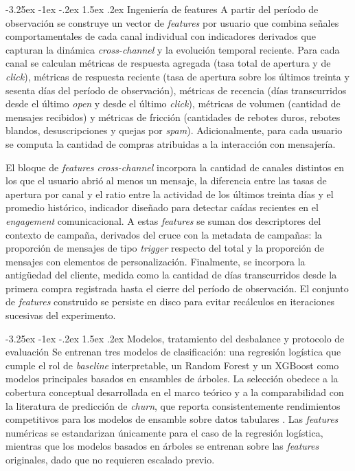 \documentclass[11pt,a4paper]{article}
\makeatletter
\renewcommand\subsection{\@startsection{subsection}{2}{\z@}%
  {-3.25ex \@plus -1ex \@minus -.2ex}%
  {1.5ex \@plus .2ex}%
  {\normalfont\normalsize\itshape}}
\makeatother
\begin{document}
\subsection{Ingeniería de features}
A partir del período de observación se construye un vector de \textit{features} por usuario que combina señales comportamentales de cada canal individual con indicadores derivados que capturan la dinámica \textit{cross-channel} y la evolución temporal reciente. Para cada canal se calculan métricas de respuesta agregada (tasa total de apertura y de \textit{click}), métricas de respuesta reciente (tasa de apertura sobre los últimos treinta y sesenta días del período de observación), métricas de recencia (días transcurridos desde el último \textit{open} y desde el último \textit{click}), métricas de volumen (cantidad de mensajes recibidos) y métricas de fricción (cantidades de rebotes duros, rebotes blandos, desuscripciones y quejas por \textit{spam}). Adicionalmente, para cada usuario se computa la cantidad de compras atribuidas a la interacción con mensajería.
 
El bloque de \textit{features cross-channel} incorpora la cantidad de canales distintos en los que el usuario abrió al menos un mensaje, la diferencia entre las tasas de apertura por canal y el ratio entre la actividad de los últimos treinta días y el promedio histórico, indicador diseñado para detectar caídas recientes en el \textit{engagement} comunicacional. A estas \textit{features} se suman dos descriptores del contexto de campaña, derivados del cruce con la metadata de campañas: la proporción de mensajes de tipo \textit{trigger} respecto del total y la proporción de mensajes con elementos de personalización. Finalmente, se incorpora la antigüedad del cliente, medida como la cantidad de días transcurridos desde la primera compra registrada hasta el cierre del período de observación. El conjunto de \textit{features} construido se persiste en disco para evitar recálculos en iteraciones sucesivas del experimento.
 
\subsection{Modelos, tratamiento del desbalance y protocolo de evaluación}
Se entrenan tres modelos de clasificación: una regresión logística que cumple el rol de \textit{baseline} interpretable, un Random Forest y un XGBoost como modelos principales basados en ensambles de árboles. La selección obedece a la cobertura conceptual desarrollada en el marco teórico y a la comparabilidad con la literatura de predicción de \textit{churn}, que reporta consistentemente rendimientos competitivos para los modelos de ensamble sobre datos tabulares \cite{brito2024framework,lalwani2022customer}. Las \textit{features} numéricas se estandarizan únicamente para el caso de la regresión logística, mientras que los modelos basados en árboles se entrenan sobre las \textit{features} originales, dado que no requieren escalado previo.
 
\end{document}

